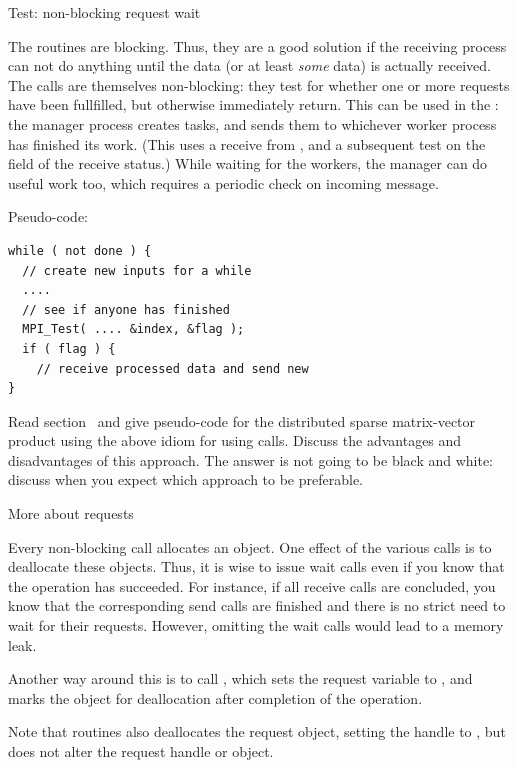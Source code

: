  {Test: non-blocking request wait}
\label{sec:mpi-test}

The  routines are blocking. Thus, they are a good solution if 
the receiving process can not do anything until the data 
(or at least \emph{some} data) is actually received.
The  calls are themselves non-blocking: they
test for whether one or more requests have been
fullfilled, but otherwise immediately return.
This can be used in the
: the manager process creates tasks, and
sends them to whichever worker process has finished its work.
(This uses a receive from , and a
subsequent test on the  field of the receive status.)
While waiting for the workers, the manager can do useful work too,
which requires a periodic check on incoming message.

Pseudo-code:
\begin{lstlisting}
while ( not done ) {
  // create new inputs for a while
  ....
  // see if anyone has finished
  MPI_Test( .... &index, &flag );
  if ( flag ) {
    // receive processed data and send new
}
\end{lstlisting}


\begin{exercise}
  Read section~ and give pseudo-code for the
    distributed sparse matrix-vector product using the above idiom for
    using  calls. Discuss the advantages and
    disadvantages of this approach. The answer is not going to be
    black and white: discuss when you expect which approach to be
    preferable.
\end{exercise}

 {More about requests}

Every non-blocking call allocates an 
object. One effect of the various  calls is
to deallocate these objects. Thus, it is wise to issue wait calls even
if you know that the operation has succeeded. For instance, if all
receive calls are concluded, you know that the corresponding send
calls are finished and there is no strict need to wait for their
requests. However, omitting the wait calls would lead to a memory
leak.

Another way around this is to call ,
which sets the request variable to ,
and marks the object for deallocation after completion of the
operation.

Note that  routines also deallocates the
request object, setting the handle to ,
but  does not alter the request
handle or object.



